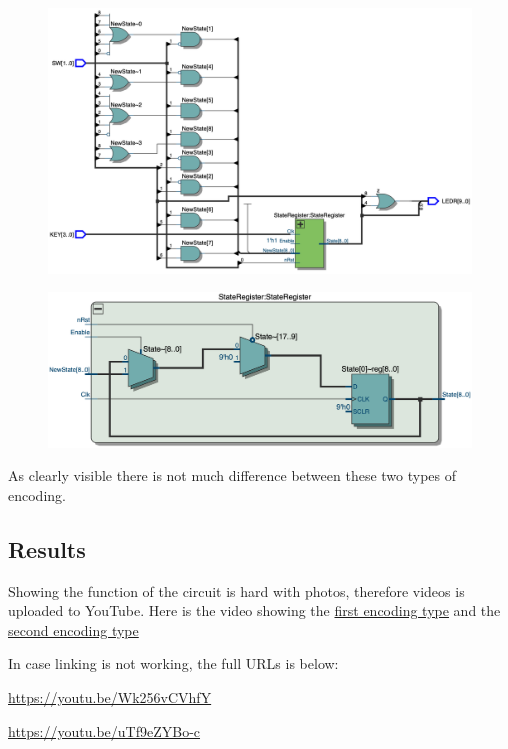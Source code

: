 \documentclass{article}
\begin{document}
\clearpage
\begin{figure}[h]
    \centering
    \includegraphics[width=1\textwidth]{Figures/Part1_RTL_TLE_new.jpg}
    \label{fig:p1_RTL_TLE_new}
\end{figure}
\hfill
\begin{figure}[h]
    \centering
    \includegraphics[width=1\textwidth]{Figures/Part1_RTL_StateRegister_new.jpg}
    \label{fig:p1_RTL_StateReg_new}
\end{figure}

As clearly visible there is not much difference between these two types of encoding.

\clearpage
\subsection{Results}
Showing the function of the circuit is hard with photos, therefore videos is uploaded to YouTube. Here is the video showing the \href{https://youtu.be/Wk256vCVhfY}{first encoding type} and the \href{https://youtu.be/uTf9eZYBo-c}{second encoding type}\par
In case linking is not working, the full URLs is below: \par
\url{https://youtu.be/Wk256vCVhfY}\par
\url{https://youtu.be/uTf9eZYBo-c}
\end{document}
